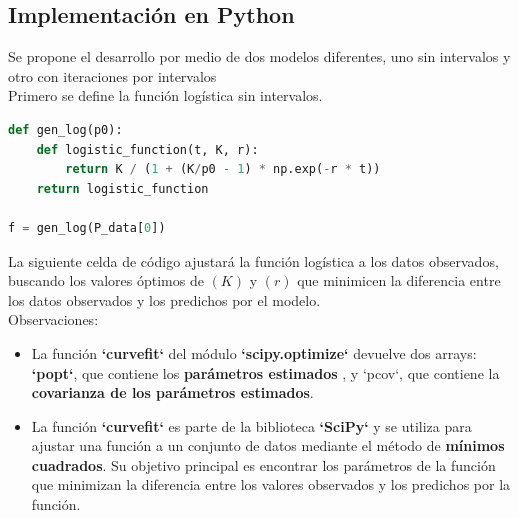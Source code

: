 \documentclass[a4paper,10pt,twocolumn]{article}
\begin{document}
	\subsection{Implementación en Python}\label{sub:python}
Se propone el desarrollo por medio de dos modelos diferentes, uno sin intervalos y otro con iteraciones por intervalos\\
Primero se define la función logística sin intervalos.
\begin{lstlisting}[language=Python, caption=Código función logística sin intervalos]
def gen_log(p0):
	def logistic_function(t, K, r):
		return K / (1 + (K/p0 - 1) * np.exp(-r * t))
	return logistic_function
				
f = gen_log(P_data[0])
\end{lstlisting}

La siguiente celda de código ajustará la función logística a los datos observados, buscando los valores óptimos de $(K)$ y $(r)$ que minimicen la diferencia entre los datos observados y los predichos por el modelo.\\ 
Observaciones:
\begin{itemize}
	\item La función \textbf{`curvefit`} del módulo \textbf{`scipy.optimize`} devuelve dos arrays: \textbf{`popt`}, que contiene los \textbf{parámetros estimados} , y `pcov`, que contiene la \textbf{covarianza de los parámetros estimados}.
	\item La función \textbf{`curvefit`} es parte de la biblioteca \textbf{`SciPy`} y se utiliza para ajustar una función a un conjunto de datos mediante el método de \textbf{mínimos cuadrados}. Su objetivo principal es encontrar los parámetros de la función que minimizan la diferencia entre los valores observados y los predichos por la función.
\end{itemize}
\end{document}
